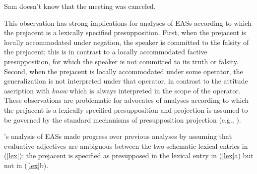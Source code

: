 \documentclass[11pt,fleqn]{article}
\newcommand{\6}{\mbox{$[\hspace*{-.6mm}[$}}
\newcommand{\9}{\mbox{$]\hspace*{-.6mm}]$}}
\newcommand{\citepos}[1]{\citeauthor{#1}'s \citeyear{#1}}
\begin{document}
\begin{exe}
\ex\label{stop} Sam doesn't know that the meeting was canceled.
\end{exe}
This observation has strong implications for analyses of EASs according to which the prejacent is a lexically specified presupposition. First, when the prejacent is locally accommodated under negation, the speaker is committed to the falsity of the prejacent; this is in contrast to a locally accommodated factive presupposition, for which the speaker is not committed to its truth or falsity. Second, when the prejacent is locally accommodated under some operator, the generalization is not interpreted under that operator, in contrast to the attitude ascription with {\em know} which is always interpreted in the scope of the operator. These observations are problematic for advocates of analyses according to which the prejacent is a lexically specified presupposition and projection is assumed to be governed by the standard mechanisms of presupposition projection (e.g., \citealt{heim83,vds92}). 

\citepos{karttunen-etal2014} analysis of EASs made progress over previous analyses by assuming that evaluative adjectives are ambiguous between the two schematic lexical entries in (\ref{lex}): the prejacent is specified as presupposed in the lexical entry in  (\ref{lex}a) but not in (\ref{lex}b). 
\end{document}
